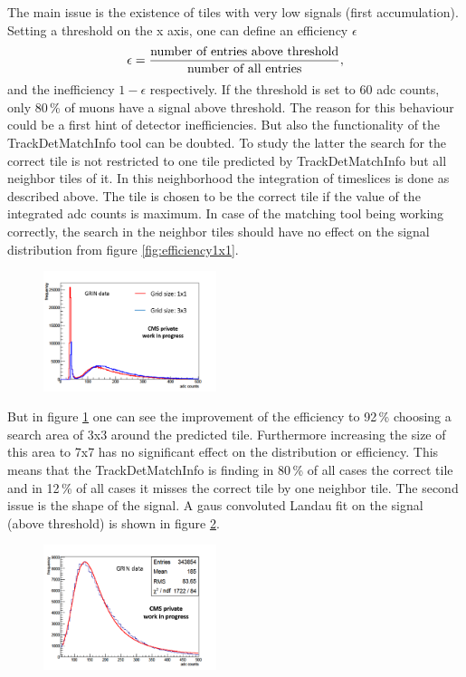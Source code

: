 			The main issue is the existence of tiles with very low signals (first accumulation).
			Setting a threshold on the x axis, one can define an efficiency $\epsilon$
			\begin{equation}
				\epsilon = \frac{\textnormal{number of entries above threshold}}{\textnormal{number of all entries}},
			\end{equation}
			and the inefficiency $1-\epsilon$ respectively.
			If the threshold is set to 60 adc counts, only 80\,\% of muons have a signal above threshold.
			The reason for this behaviour could be a first hint of detector inefficiencies.
			But also the functionality of the TrackDetMatchInfo tool can be doubted.
			To study the latter the search for the correct tile is not restricted to one tile predicted by TrackDetMatchInfo but all neighbor tiles of it.
			In this neighborhood the integration of timeslices is done as described above.
			The tile is chosen to be the correct tile if the value of the integrated adc counts is maximum.
			In case of the matching tool being working correctly, the search in the neighbor tiles should have no effect on the signal distribution from figure \ref{fig:efficiency1x1}.
			\begin{figure}[htbp]
				\centering
				\includegraphics[width=0.45\textwidth]{Figures/erdogan/neighborhood.png}
				\caption{}
				\label{fig:neighborhood}
			\end{figure}
			But in figure \ref{fig:neighborhood} one can see the improvement of the efficiency to 92\,\% choosing a search area of 3x3 around the predicted tile.
			Furthermore increasing the size of this area to 7x7 has no significant effect on the distribution or efficiency.
			This means that the TrackDetMatchInfo is finding in 80\,\% of all cases the correct tile and in 12\,\% of all cases it misses the correct tile by one neighbor tile.
			The second issue is the shape of the signal.
			A gaus convoluted Landau fit on the signal (above threshold) is shown in figure \ref{fig:langaus_bad}.
			\begin{figure}[htbp]
				\centering
				\includegraphics[width=0.45\textwidth]{Figures/erdogan/langaus_bad.png}
				\caption{}
				\label{fig:langaus_bad}
			\end{figure}
